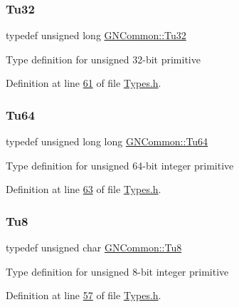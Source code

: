 \subsubsection{\texorpdfstring{Tu32}{Tu32}}
{\footnotesize\ttfamily typedef unsigned long \mbox{\hyperlink{namespace_g_n_common_a941b527ef318f318aed7903dc832b7e4}{G\+N\+Common\+::\+Tu32}}}

Type definition for unsigned 32-\/bit primitive 

Definition at line \mbox{\hyperlink{_types_8h_source_l00061}{61}} of file \mbox{\hyperlink{_types_8h_source}{Types.\+h}}.

\mbox{\label{namespace_g_n_common_a9404ee6090c788ae70aebd1436ceb97d}} 
\subsubsection{\texorpdfstring{Tu64}{Tu64}}
{\footnotesize\ttfamily typedef unsigned long long \mbox{\hyperlink{namespace_g_n_common_a9404ee6090c788ae70aebd1436ceb97d}{G\+N\+Common\+::\+Tu64}}}

Type definition for unsigned 64-\/bit integer primitive 

Definition at line \mbox{\hyperlink{_types_8h_source_l00063}{63}} of file \mbox{\hyperlink{_types_8h_source}{Types.\+h}}.

\mbox{\label{namespace_g_n_common_a7939e251ddbf5d3a31832dcfdc8bde39}} 
\subsubsection{\texorpdfstring{Tu8}{Tu8}}
{\footnotesize\ttfamily typedef unsigned char \mbox{\hyperlink{namespace_g_n_common_a7939e251ddbf5d3a31832dcfdc8bde39}{G\+N\+Common\+::\+Tu8}}}

Type definition for unsigned 8-\/bit integer primitive 

Definition at line \mbox{\hyperlink{_types_8h_source_l00057}{57}} of file \mbox{\hyperlink{_types_8h_source}{Types.\+h}}.

